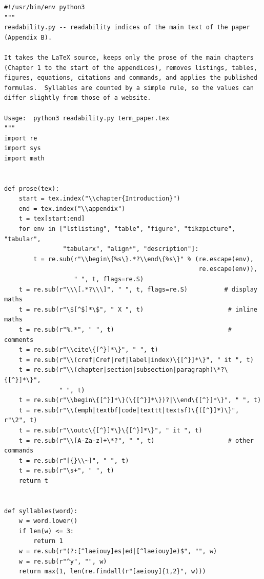 \begin{lstlisting}[style=vspython]
#!/usr/bin/env python3
"""
readability.py -- readability indices of the main text of the paper (Appendix B).

It takes the LaTeX source, keeps only the prose of the main chapters
(Chapter 1 to the start of the appendices), removes listings, tables,
figures, equations, citations and commands, and applies the published
formulas.  Syllables are counted by a simple rule, so the values can
differ slightly from those of a website.

Usage:  python3 readability.py term_paper.tex
"""
import re
import sys
import math


def prose(tex):
    start = tex.index("\\chapter{Introduction}")
    end = tex.index("\\appendix")
    t = tex[start:end]
    for env in ["lstlisting", "table", "figure", "tikzpicture", "tabular",
                "tabularx", "align*", "description"]:
        t = re.sub(r"\\begin\{%s\}.*?\\end\{%s\}" % (re.escape(env),
                                                     re.escape(env)),
                   " ", t, flags=re.S)
    t = re.sub(r"\\\[.*?\\\]", " ", t, flags=re.S)          # display maths
    t = re.sub(r"\$[^$]*\$", " X ", t)                       # inline maths
    t = re.sub(r"%.*", " ", t)                               # comments
    t = re.sub(r"\\cite\{[^}]*\}", " ", t)
    t = re.sub(r"\\(cref|Cref|ref|label|index)\{[^}]*\}", " it ", t)
    t = re.sub(r"\\(chapter|section|subsection|paragraph)\*?\{[^}]*\}",
               " ", t)
    t = re.sub(r"\\begin\{[^}]*\}(\{[^}]*\})?|\\end\{[^}]*\}", " ", t)
    t = re.sub(r"\\(emph|textbf|code|texttt|textsf)\{([^}]*)\}", r"\2", t)
    t = re.sub(r"\\outc\{[^}]*\}\{[^}]*\}", " it ", t)
    t = re.sub(r"\\[A-Za-z]+\*?", " ", t)                    # other commands
    t = re.sub(r"[{}\\~]", " ", t)
    t = re.sub(r"\s+", " ", t)
    return t


def syllables(word):
    w = word.lower()
    if len(w) <= 3:
        return 1
    w = re.sub(r"(?:[^laeiouy]es|ed|[^laeiouy]e)$", "", w)
    w = re.sub(r"^y", "", w)
    return max(1, len(re.findall(r"[aeiouy]{1,2}", w)))



\end{lstlisting}

